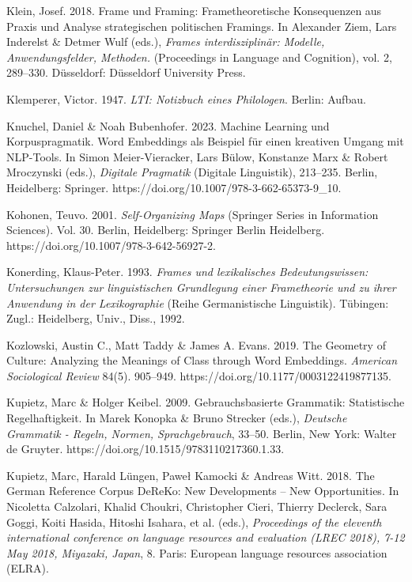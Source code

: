 Klein, Josef. 2018. Frame und Framing: Frametheoretische Konsequenzen aus Praxis und Analyse strategischen politischen Framings. In Alexander Ziem, Lars Inderelst \& Detmer Wulf (eds.), \emph{Frames interdisziplinär: Modelle, Anwendungsfelder, Methoden.} (Proceedings in Language and Cognition), vol. 2, 289--330. Düsseldorf: Düsseldorf University Press.

Klemperer, Victor. 1947. \emph{LTI: Notizbuch eines Philologen}. Berlin: Aufbau.

Knuchel, Daniel \& Noah Bubenhofer. 2023. Machine Learning und Korpuspragmatik. Word Embeddings als Beispiel für einen kreativen Umgang mit NLP-Tools. In Simon Meier-Vieracker, Lars Bülow, Konstanze Marx \& Robert Mroczynski (eds.), \emph{Digitale Pragmatik} (Digitale Linguistik), 213--235. Berlin, Heidelberg: Springer. https://doi.org/10.1007/978-3-662-65373-9\_10.

Kohonen, Teuvo. 2001. \emph{Self-Organizing Maps} (Springer Series in Information Sciences). Vol. 30. Berlin, Heidelberg: Springer Berlin Heidelberg. https://doi.org/10.1007/978-3-642-56927-2.

Konerding, Klaus-Peter. 1993. \emph{Frames und lexikalisches Bedeutungswissen: Untersuchungen zur linguistischen Grundlegung einer Frametheorie und zu ihrer Anwendung in der Lexikographie} (Reihe Germanistische Linguistik). Tübingen: Zugl.: Heidelberg, Univ., Diss., 1992.

Kozlowski, Austin C., Matt Taddy \& James A. Evans. 2019. The Geometry of Culture: Analyzing the Meanings of Class through Word Embeddings. \emph{American Sociological Review} 84(5). 905--949. https://doi.org/10.1177/0003122419877135.

Kupietz, Marc \& Holger Keibel. 2009. Gebrauchsbasierte Grammatik: Statistische Regelhaftigkeit. In Marek Konopka \& Bruno Strecker (eds.), \emph{Deutsche Grammatik - Regeln, Normen, Sprachgebrauch}, 33--50. Berlin, New York: Walter de Gruyter. https://doi.org/10.1515/9783110217360.1.33.

Kupietz, Marc, Harald Lüngen, Paweł Kamocki \& Andreas Witt. 2018. The German Reference Corpus DeReKo: New Developments -- New Opportunities. In Nicoletta Calzolari, Khalid Choukri, Christopher Cieri, Thierry Declerck, Sara Goggi, Koiti Hasida, Hitoshi Isahara, et al. (eds.), \emph{Proceedings of the eleventh international conference on language resources and evaluation (LREC 2018), 7-12 May 2018, Miyazaki, Japan}, 8. Paris: European language resources association (ELRA).

